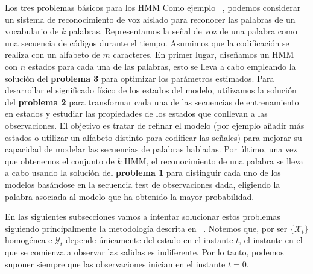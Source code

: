 \begin{section}{Los tres problemas básicos para los HMM}
Como ejemplo ~\cite{Rabiner}, podemos considerar un sistema de reconocimiento de voz aislado para reconocer las palabras de un vocabulario de $k$ palabras. Representamos la señal de voz de una palabra como una secuencia de códigos durante el tiempo. Asumimos que la codificación se realiza con un alfabeto de $m$ caracteres. En primer lugar, diseñamos un HMM con $n$ estados para cada una de las palabras, esto se lleva a cabo empleando la solución del \textbf{problema 3} para optimizar los parámetros estimados. Para desarrollar el significado físico de los estados del modelo, utilizamos la solución del \textbf{problema 2} para transformar cada una de las secuencias de entrenamiento en estados y estudiar las propiedades de los estados que conllevan a las observaciones. El objetivo es tratar de refinar el modelo (por ejemplo añadir más estados o utilizar un alfabeto distinto para codificar las señales) para mejorar su capacidad de modelar las secuencias de palabras habladas. Por último, una vez que obtenemos el conjunto de $k$ HMM, el reconocimiento de una palabra se lleva a cabo usando la solución del \textbf{problema 1} para distinguir cada uno de los modelos basándose en la secuencia test de observaciones dada, eligiendo la palabra asociada al modelo que ha obtenido la mayor probabilidad.

En las siguientes subsecciones vamos a intentar solucionar estos problemas siguiendo principalmente la metodología descrita en ~\cite{Rabiner}. Notemos que, por ser $\{\mathcal{X}_t\}$ homogénea e $\mathcal{Y}_t$ depende únicamente del estado en el instante $t$, el instante en el que se comienza a observar las salidas es indiferente. Por lo tanto, podemos suponer siempre que las observaciones inician en el instante $t=0$.


\end{section}
